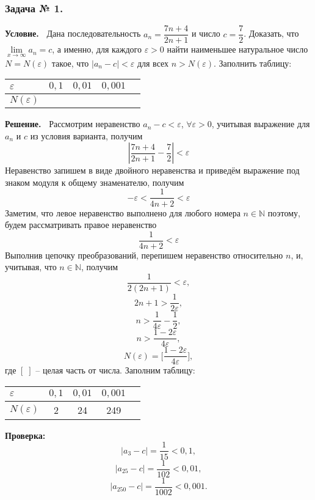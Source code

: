 \documentclass[12pt]{article}
\begin{document}
\subsubsection*{\center Задача № 1.}
{\bf Условие.~}
Дана последовательность $a_{n}=\dfrac{7n+4}{2n+1}$ и число $c=\dfrac{7}{2}$. Доказать, что $\lim\limits_{x\rightarrow\infty} a_{n}=c $, а именно, для каждого $\varepsilon>0$ найти наименьшее натуральное число  $N{=}N(\varepsilon)$ такое, что $|a_{n}-c|<\varepsilon$ для всех $n>N(\varepsilon)$. Заполнить таблицу: 
\begin{center}
\begin{tabular}{ | p{25pt} | c | c | c | c |}
\hline
$\varepsilon$& $0{,}1$ & $0{,}01$ & $0{,}001$ \\ \hline
$N(\varepsilon)$ &   &   &\\
\hline
\end{tabular}
\end{center}
\medskip
{\bf Решение.~}
Рассмотрим неравенство $a_{n}-c<\varepsilon$, $\forall\varepsilon>0$, учитывая выражение для $a_{n}$ и $c$ из условия варианта, получим 
$$\left|\frac{7n+4}{2n+1}-\frac{7}{2}\right|<\varepsilon$$
Неравенство запишем в виде двойного неравенства и приведём выражение под знаком модуля к общему знаменателю, получим
$${-}\varepsilon <\dfrac{1}{4n+2}<\varepsilon$$
Заметим, что левое неравенство выполнено для любого номера $n\in \mathbb{N}$ поэтому, будем рассматривать правое неравенство
$$\frac{1}{4n+2}<\varepsilon$$
Выполнив цепочку преобразований, перепишем неравенство относительно $n$, и, учитывая, что $n\in \mathbb{N}$, получим 
$$\dfrac{1}{2(2n+1)}<\varepsilon,$$
$$2n+1>\dfrac{1}{2\varepsilon},$$
$$n>\dfrac{1}{4\varepsilon}-\dfrac{1}{2},$$
$$n>\dfrac{1-2\varepsilon}{4\varepsilon},$$
$$N(\varepsilon)=\biggl[\dfrac{1-2\varepsilon}{4\varepsilon}\biggr],$$
где $[\;]$ -- целая часть от числа. Заполним таблицу:
\begin{center}
\begin{tabular}{ | p{25pt} | c | c | c | c |}
\hline
$\varepsilon$& $0{,}1$ & $0{,}01$ & $0{,}001$ \\ \hline
$N(\varepsilon)$ & 2  & 24 & 249\\
\hline
\end{tabular}
\end{center}
{\bf Проверка:~}
$$|a_{3}-c|=\dfrac{1}{15}<0{,}1,$$
$$|a_{25}-c|=\dfrac{1}{102}<0{,}01,$$
$$|a_{250}-c|=\dfrac{1}{1002}<0{,}001.$$
\newpage
\end{document}
